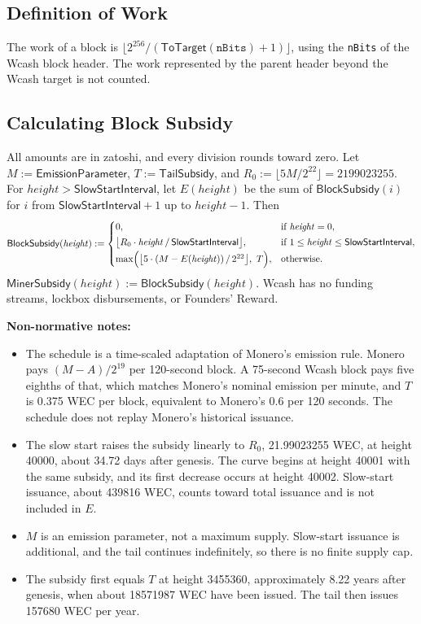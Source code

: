 \documentclass[10pt,letterpaper]{article}
\newcommand\fn[1]{\mathsf{#1}}
\newcommand\rules[1]{\par\textbf{#1}}
\theoremstyle{plain}
\begin{document}
\subsection{Definition of Work}\label{sec:work}

The work of a block is $\bigl\lfloor 2^{256} / (\fn{ToTarget}(\mathtt{nBits}) + 1) \bigr\rfloor$, using the \texttt{nBits} of the Wcash block header. The work represented by the parent header beyond the Wcash target is not counted.

\subsection{Calculating Block Subsidy}\label{sec:subsidy}

All amounts are in zatoshi, and every division rounds toward zero. Let $M := \fn{EmissionParameter}$, $T := \fn{TailSubsidy}$, and $R_0 := \lfloor 5M / 2^{22} \rfloor = 2199023255$. For $\mathit{height} > \fn{SlowStartInterval}$, let $E(\mathit{height})$ be the sum of $\fn{BlockSubsidy}(i)$ for $i$ from $\fn{SlowStartInterval} + 1$ up to $\mathit{height} - 1$. Then
\[
\fn{BlockSubsidy}(\mathit{height}) :=
\begin{cases}
0, & \text{if } \mathit{height} = 0,\\[2pt]
\bigl\lfloor R_0 \cdot \mathit{height} \,/\, \fn{SlowStartInterval} \bigr\rfloor, & \text{if } 1 \le \mathit{height} \le \fn{SlowStartInterval},\\[2pt]
\max\Bigl(\bigl\lfloor 5 \cdot (M - E(\mathit{height})) \,/\, 2^{22} \bigr\rfloor,\ T\Bigr), & \text{otherwise.}
\end{cases}
\]
$\fn{MinerSubsidy}(\mathit{height}) := \fn{BlockSubsidy}(\mathit{height})$. Wcash has no funding streams, lockbox disbursements, or Founders' Reward.

\rules{Non-normative notes:}
\begin{itemize}
\item The schedule is a time-scaled adaptation of Monero's emission rule. Monero pays $(M - A)/2^{19}$ per 120-second block. A 75-second Wcash block pays five eighths of that, which matches Monero's nominal emission per minute, and $T$ is 0.375 WEC per block, equivalent to Monero's 0.6 per 120 seconds. The schedule does not replay Monero's historical issuance.
\item The slow start raises the subsidy linearly to $R_0$, 21.99023255 WEC, at height 40000, about 34.72 days after genesis. The curve begins at height 40001 with the same subsidy, and its first decrease occurs at height 40002. Slow-start issuance, about 439816 WEC, counts toward total issuance and is not included in $E$.
\item $M$ is an emission parameter, not a maximum supply. Slow-start issuance is additional, and the tail continues indefinitely, so there is no finite supply cap.
\item The subsidy first equals $T$ at height 3455360, approximately 8.22 years after genesis, when about 18571987 WEC have been issued. The tail then issues 157680 WEC per year.
\end{itemize}
\end{document}

